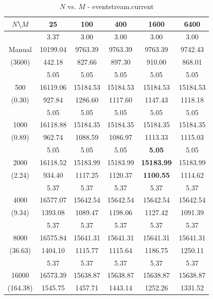 \begin{table}[th]
\caption{$N$ vs. $M$ - eventstream.current}
\label{tab:eventstream.current}
\centering
\begin{tabular}{|c||c|c|c|c|c|}
\hline
$N$\textbackslash $M$& 25 & 100 & 400 & 1600 & 6400 \\ \hline \hline
       & 3.37     & 3.00    & 3.00    & 3.00    & 3.00 \\ 
Manual & 10199.04 & 9763.39 & 9763.39 & 9763.39 & 9742.43 \\
(3600) & 442.18  & 827.66  & 897.30 & 910.00 & 868.01 \\ \hline
     & 5.05 & 5.05 & 5.05 & 5.05 & 5.05\\
500  & 16119.06 & 15184.53 & 15184.53 & 15184.53 & 15184.53\\ 
(0.30)  & 927.84 & 1286.60 & 1117.60 & 1147.43 & 1118.18\\ \hline 
  & 5.05 & 5.05 & 5.05 & 5.05 & 5.05\\ 
1000  & 16118.88 & 15184.35 & 15184.35 & 15184.35 & 15184.35\\ 
(0.89)  & 962.74 & 1088.59 & 1086.97 & 1113.33 & 1115.03\\ \hline 
  & 5.05 & 5.05 & 5.05 & {\bf 5.05} & 5.05\\ 
2000  & 16118.52 & 15183.99 & 15183.99 & {\bf 15183.99} & 15183.99\\ 
(2.24)  & 934.40 & 1117.25 & 1120.37 & {\bf 1100.55} & 1114.62\\ \hline 
  & 5.37 & 5.37 & 5.37 & 5.37 & 5.37\\ 
4000  & 16577.07 & 15642.54 & 15642.54 & 15642.54 & 15642.54\\ 
(9.34)  & 1393.08 & 1089.47 & 1198.06 & 1127.42 & 1091.39\\ \hline 
  & 5.37 & 5.37 & 5.37 & 5.37 & 5.37\\ 
8000  & 16575.84 & 15641.31 & 15641.31 & 15641.31 & 15641.31\\ 
(36.63)  & 1404.10 & 1115.77 & 1115.64 & 1186.75 & 1250.11\\ \hline 
  & 5.37 & 5.37 & 5.37 & 5.37 & 5.37\\ 
16000  & 16573.39 & 15638.87 & 15638.87 & 15638.87 & 15638.87\\ 
(164.38)  & 1545.75 & 1457.71 & 1443.14 & 1252.26 & 1331.52\\ \hline 
\end{tabular}
\end{table}
